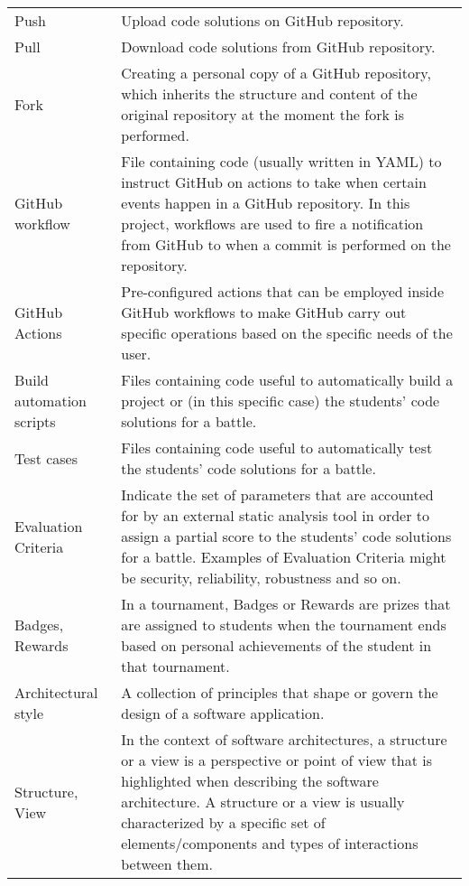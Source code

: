\begin{longtable}[]{m{5cm} m{9cm}}
	Push & Upload code solutions on GitHub repository.\\
	
	Pull & Download code solutions from GitHub repository.\\
	
	Fork & Creating a personal copy of a GitHub repository, which inherits the structure and content of the original repository at the moment the fork is performed.\\
	
	GitHub workflow & File containing code (usually written in YAML) to instruct GitHub on actions to take when certain events happen in a GitHub repository. In this project, workflows are used to fire a notification from GitHub to \app when a commit is performed on the repository.\\
	
	GitHub Actions & Pre-configured actions that can be employed inside GitHub workflows to make GitHub carry out specific operations based on the specific needs of the user. \\
	
	Build automation scripts & Files containing code useful to automatically build a project or (in this specific case) the students' code solutions for a battle.\\
	
	Test cases & Files containing code useful to automatically test the students' code solutions for a battle.\\
	
	Evaluation Criteria & Indicate the set of parameters that are accounted for by an external static analysis tool in order to assign a partial score to the students' code solutions for a battle. Examples of Evaluation Criteria might be security, reliability, robustness and so on.\\
	
	Badges, Rewards & In a tournament, Badges or Rewards are prizes that are assigned to students when the tournament ends based on personal achievements of the student in that tournament.\\
	
	Architectural style & A collection of principles that shape or govern the design of a software application.\\
	
	Structure, View & In the context of software architectures, a structure or a view is a perspective or point of view that is highlighted when describing the software architecture. A structure or a view is usually characterized by a specific set of elements/components and types of interactions between them.\\
	

\end{longtable}
